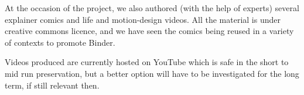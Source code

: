 \documentclass{deliverablereport}
\begin{document}
At the occasion of the project, we also authored (with the help of
experts) several explainer comics and life and motion-design videos.
All the material is under creative commons licence, and we have seen
the comics being reused in a variety of contexts to promote Binder.

Videos produced are currently hosted on YouTube which is safe in the
short to mid run preservation, but a better option will have to be
investigated for the long term, if still relevant then.

\printbibliography
\end{document}
